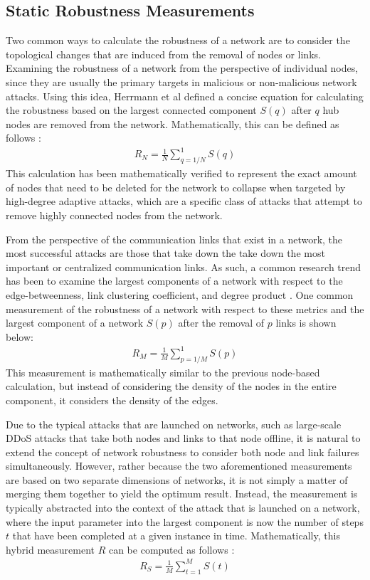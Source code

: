 \documentclass[doc]{apa}%
\begin{document}
\subsection{Static Robustness Measurements}

Two common ways to calculate the robustness of a network are to consider the topological changes that are induced from the removal of nodes or links. Examining the robustness of a network from the perspective of individual nodes, since they are  usually the primary targets in malicious or non-malicious network attacks. Using this idea, Herrmann et al defined a concise equation for calculating the robustness based on the largest connected component $S(q)$ after $q$ hub nodes are removed from the network. Mathematically, this can be defined as follows \cite{Onion}:
\begin{eqnarray}
R_{N} = \frac{1}{N}\sum_{q=1/N}^{1}S(q)
\end{eqnarray}
This calculation has been mathematically verified to represent the exact amount of nodes that need to be deleted for the network to collapse when targeted by high-degree adaptive attacks, which are a specific class of attacks that attempt to remove highly connected nodes from the network. 


From the perspective of the communication links that exist in a network, the most successful attacks are those that take down the take down the most important or centralized communication links. As such, a common research trend has been to examine the largest components of a network with respect to the edge-betweenness, link clustering coefficient, and degree product \cite{NRMalicious}. One common measurement of the robustness of a network with respect to these metrics and the largest component of a network $S(p)$ after the removal of $p$ links is shown below:
\begin{eqnarray}
R_M = \frac{1}{M}\sum_{p = 1/M}^{1}S(p)
\end{eqnarray}
This measurement is mathematically similar to the previous node-based calculation, but instead of considering the density of the nodes in the entire component, it considers the density of the edges. 

Due to the typical attacks that are launched on networks, such as large-scale DDoS attacks that take both nodes and links to that node offline, it is natural to extend the concept of network robustness to consider both node and link failures simultaneously. However, rather because the two aforementioned measurements are based on two separate dimensions of networks, it is not simply a matter of merging them together to yield the optimum result. Instead, the measurement is typically abstracted into the context of the attack that is launched on a network, where the input parameter into the largest component is now the number of steps $t$ that have been completed at a given instance in time. Mathematically, this hybrid measurement $R$ can be computed as follows \cite{NRMalicious}:
\begin{eqnarray}
R_S = \frac{1}{M}\sum_{t  = 1}^{M}S(t)
\end{eqnarray}
\end{document}
